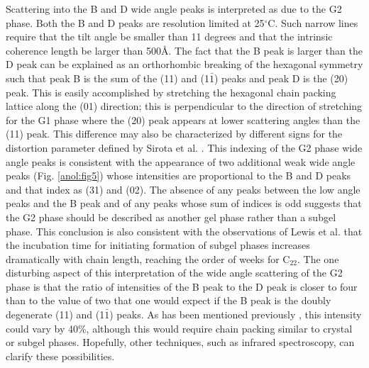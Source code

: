 
Scattering into the B and D wide angle peaks is interpreted as due to
the G2 phase. Both the B and D peaks are resolution limited at
25$^{\circ}$C.  Such narrow lines require that the tilt angle be
smaller than 11 degrees and that the intrinsic coherence length
be larger than 500\AA.  
The fact that the B peak is larger than the D peak can be explained as
an orthorhombic breaking of the hexagonal symmetry such that peak B is the sum of the
(11) and (1$\bar{1}$) peaks and peak D is the (20) peak.
This is easily accomplished by stretching the hexagonal chain packing lattice
along the (01) direction; this is perpendicular to the direction of
stretching for the G1 phase where the (20) peak appears at lower scattering 
angles than the (11) peak.  This difference may also be characterized by
different signs for the distortion parameter defined by Sirota et al. \cite{Sir93}.
This indexing of the G2 phase wide angle peaks is consistent with the appearance 
of two additional weak wide angle peaks (Fig. \ref{anol:fig5}) whose
intensities are proportional to the B and D peaks and that
index as (31) and (02).  The absence of any peaks between the low
angle peaks and the B peak and of any peaks whose sum of indices is odd
suggests that the G2 phase should be described as another gel phase rather
than a subgel phase.  This conclusion is also consistent with the
observations of Lewis et al. \cite{LMc87} that the incubation time for
initiating formation of subgel phases increases dramatically with chain length,
reaching the order of weeks for C$_{22}$.
The one disturbing aspect of this interpretation of
the wide angle scattering of the G2 phase is that the ratio of 
intensities of the B peak to the D peak is closer to four than to the value
of two that one would expect if the B peak is the doubly degenerate (11)
and (1$\bar{1}$) peaks.  As has been mentioned previously \cite{Sun94}, this
intensity could vary by 40\%, although this would require chain packing similar
to crystal or subgel phases.  Hopefully, other techniques, such as infrared
spectroscopy, can clarify these possibilities.

